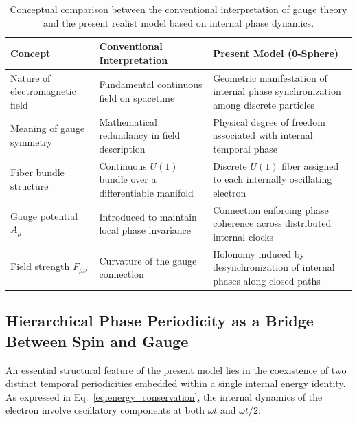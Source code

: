 \documentclass[%
 reprint,
 amsmath,amssymb,
 aps,
]{revtex4-1}
\numberwithin{equation}{section}%
\begin{document}
\begin{table}[t!]
\renewcommand{\arraystretch}{1.5} %
\centering
\caption{Conceptual comparison between the conventional interpretation of gauge theory and the present realist model based on internal phase dynamics.}
\begin{tabular}{|p{4.5cm}|p{5.6cm}|p{6.6cm}|}
\hline
\textbf{Concept} & \textbf{Conventional Interpretation} & \textbf{Present Model (0-Sphere)} \\
\hline
Nature of electromagnetic field & Fundamental continuous field on spacetime & Geometric manifestation of internal phase synchronization among discrete particles \\
\hline
Meaning of gauge symmetry & Mathematical redundancy in field description & Physical degree of freedom associated with internal temporal phase \\
\hline
Fiber bundle structure & Continuous $U(1)$ bundle over a differentiable manifold & Discrete $U(1)$ fiber assigned to each internally oscillating electron \\
\hline
Gauge potential $A_\mu$ & Introduced to maintain local phase invariance & Connection enforcing phase coherence across distributed internal clocks \\
\hline
Field strength $F_{\mu\nu}$ & Curvature of the gauge connection & Holonomy induced by desynchronization of internal phases along closed paths \\
\hline
\end{tabular}
\label{tab:conceptual_comparison}
\end{table}


\subsection{Hierarchical Phase Periodicity as a Bridge Between Spin and Gauge}

An essential structural feature of the present model lies in the coexistence of two distinct temporal periodicities embedded within a single internal energy identity. As expressed in Eq.~\eqref{eq:energy_conservation}, the internal dynamics of the electron involve oscillatory components at both $\omega t$ and $\omega t/2$:
\end{document}

